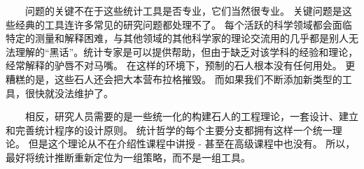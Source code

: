   问题的关键不在于这些统计工具是否专业，它们当然很专业。 关键问题是这些经典的工具连许多常见的研究问题都处理不了。 每个活跃的科学领域都会面临特定的测量和解释困难，与其他领域的其他科学家的理论交流用的几乎都是别人无法理解的“黑话”。统计专家是可以提供帮助，但由于缺乏对该学科的经验和理论，经常解释的驴唇不对马嘴。 在这样的环境下，预制的石人根本没有任何用处。 更糟糕的是，这些石人还会把大本营布拉格摧毁。 而如果我们不断添加新类型的工具，很快就没法维护了。

  相反，研究人员需要的是一些统一化的构建石人的工程理论，一套设计、建立和完善统计程序的设计原则。 统计哲学的每个主要分支都拥有这样一个统一理论。 但是这个理论从不在介绍性课程中讲授 - 甚至在高级课程中也没有。 所以，最好将统计推断重新定位为一组策略，而不是一组工具。
